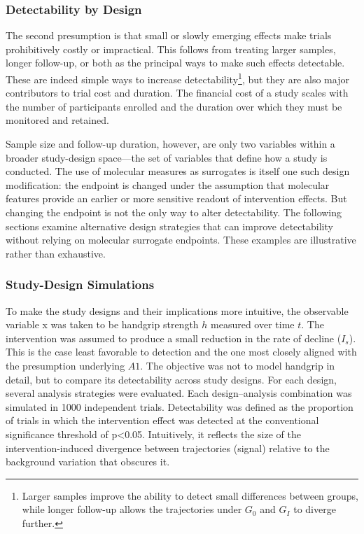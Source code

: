 \documentclass[twocolumn]{article} %
\begin{document}
\subsubsection*{Detectability by Design}

The second presumption is that small or slowly emerging effects make trials prohibitively costly or impractical. This follows from treating larger samples, longer follow-up, or both as the principal ways to make such effects detectable. These are indeed simple ways to increase detectability\footnote{Larger samples improve the ability to detect small differences between groups, while longer follow-up allows the trajectories under $G_0$ and $G_I$ to diverge further.}, but they are also major contributors to trial cost and duration. The financial cost of a study scales with the number of participants enrolled and the duration over which they must be monitored and retained. 

Sample size and follow-up duration, however, are only two variables within a broader study-design space—the set of variables that define how a study is conducted. The use of molecular measures as surrogates is itself one such design modification: the endpoint is changed under the assumption that molecular features provide an earlier or more sensitive readout of intervention effects. But changing the endpoint is not the only way to alter detectability. The following sections examine alternative design strategies that can improve detectability without relying on molecular surrogate endpoints. These examples are illustrative rather than exhaustive.


\subsubsection*{Study-Design Simulations}

To make the study designs and their implications more intuitive, the observable variable x was taken to be handgrip strength $h$ measured over time $t$. The intervention was assumed to produce a small reduction in the rate of decline ($I_s$). This is the case least favorable to detection and the one most closely aligned with the presumption underlying $A1$. The objective was not to model handgrip in detail, but to compare its detectability across study designs. For each design, several analysis strategies were evaluated. Each design–analysis combination was simulated in 1000 independent trials. Detectability was defined as the proportion of trials in which the intervention effect was detected at the conventional significance threshold of p<0.05. Intuitively, it reflects the size of the intervention-induced divergence between trajectories (signal) relative to the background variation that obscures it.
\end{document}
